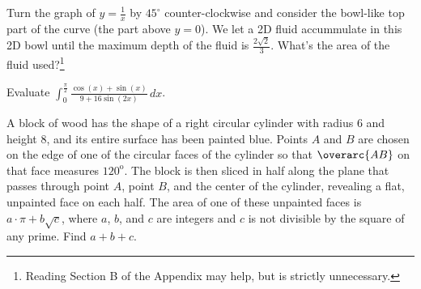 \documentclass{article}
\begin{document}
\begin{prob}[SMT 2019/7]{9}
Turn the graph of $y=\frac{1}{x}$ by $45^{\circ}$ counter-clockwise and consider the bowl-like top part of the curve (the part above $y=0$). We let a 2D fluid accummulate in this 2D bowl until the maximum depth of the fluid is $\frac{2\sqrt{2}}{3}.$ What’s the area of the fluid used?\footnote{Reading Section B of the Appendix may help, but is strictly unnecessary.}
\end{prob}

\begin{prob}{9}
Evaluate $\int_0^{\frac{\pi}{2}}\frac{\cos(x)+\sin(x)}{9+16\sin(2x)}\,dx$. %
\end{prob}

\begin{prob}[AIME I 2015/15]{13}
A block of wood has the shape of a right circular cylinder with radius $6$ and height $8$, and its entire surface has been painted blue. Points $A$ and $B$ are chosen on the edge of one of the circular faces of the cylinder so that $\overarc{AB}$ on that face measures $120^\text{o}$. The block is then sliced in half along the plane that passes through point $A$, point $B$, and the center of the cylinder, revealing a flat, unpainted face on each half. The area of one of these unpainted faces is $a\cdot\pi + b\sqrt{c}$, where $a$, $b$, and $c$ are integers and $c$ is not divisible by the square of any prime. Find $a+b+c$.
\begin{center}
    \begin{asy}

\end{asy}
\end{center}
\end{prob}
\end{document}
